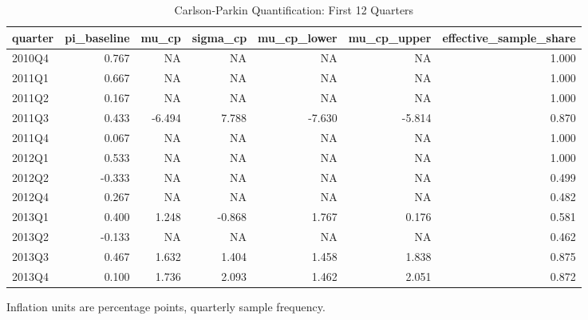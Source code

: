 \begin{table}[!htbp]
\centering
\caption{Carlson-Parkin Quantification: First 12 Quarters}
\label{tab:cp_head}
\begin{threeparttable}

\begin{tabular}{lrrrrrr}
\toprule
quarter & pi\_baseline & mu\_cp & sigma\_cp & mu\_cp\_lower & mu\_cp\_upper & effective\_sample\_share\\
\midrule
2010Q4 & 0.767 & NA & NA & NA & NA & 1.000\\
2011Q1 & 0.667 & NA & NA & NA & NA & 1.000\\
2011Q2 & 0.167 & NA & NA & NA & NA & 1.000\\
2011Q3 & 0.433 & -6.494 & 7.788 & -7.630 & -5.814 & 0.870\\
2011Q4 & 0.067 & NA & NA & NA & NA & 1.000\\
\addlinespace
2012Q1 & 0.533 & NA & NA & NA & NA & 1.000\\
2012Q2 & -0.333 & NA & NA & NA & NA & 0.499\\
2012Q4 & 0.267 & NA & NA & NA & NA & 0.482\\
2013Q1 & 0.400 & 1.248 & -0.868 & 1.767 & 0.176 & 0.581\\
2013Q2 & -0.133 & NA & NA & NA & NA & 0.462\\
\addlinespace
2013Q3 & 0.467 & 1.632 & 1.404 & 1.458 & 1.838 & 0.875\\
2013Q4 & 0.100 & 1.736 & 2.093 & 1.462 & 2.051 & 0.872\\
\bottomrule
\end{tabular}
\begin{tablenotes}[flushleft]
\footnotesize
\item Inflation units are percentage points, quarterly sample frequency.
\end{tablenotes}
\end{threeparttable}
\end{table}
